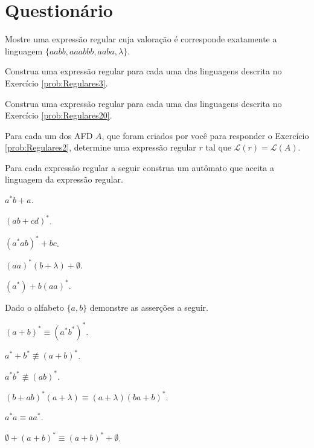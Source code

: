 \section{Questionário}

\begin{problem}\label{prob:Regulares28}
	Mostre uma expressão regular cuja valoração é corresponde exatamente a linguagem $\{aabb, aaabbb, aaba, \lambda\}$. 
\end{problem}

\begin{problem}\label{prob:Regulares29}
	Construa uma expressão regular para cada uma das linguagens descrita no Exercício \ref{prob:Regulares3}.
\end{problem}

\begin{problem}\label{prob:Regulares30}
	Construa uma expressão regular para cada uma das linguagens descrita no Exercício \ref{prob:Regulares20}.
\end{problem}

\begin{problem}\label{prob:Regulares31}
	Para cada um dos AFD $A$, que foram criados por você para responder o Exercício \ref{prob:Regulares2}, determine uma expressão regular $r$ tal que $\mathcal{L}(r) = \mathcal{L}(A)$.
\end{problem}

\begin{problem}\label{prob:Regulares32}
	Para cada expressão regular a seguir construa um autômato que aceita a linguagem da expressão regular.
\end{problem}

\begin{exerList}
	\item $a^*b + a$.
	\item $(ab + cd)^*$.
	\item $(a^*ab)^* + bc$.
	\item $(aa)^* (b + \lambda) + \emptyset$.
	\item $(a^*) + b(aa)^*$.
\end{exerList}

\begin{problem}\label{prob:Regulares33}
	Dado o alfabeto $\{a, b\}$ demonstre as asserções a seguir.
\end{problem}

\begin{exerList}
	\item $(a + b)^* \equiv (a^*b^*)^*$.
	\item $a^* + b^* \not\equiv (a + b)^*$.
	\item $a^*b^* \not\equiv (ab)^*$.
	\item $(b + ab)^* (a + \lambda) \equiv (a + \lambda)(ba + b)^*$.
	\item $a^*a \equiv aa^*$.
	\item $\emptyset + (a + b)^* \equiv (a + b)^* + \emptyset$.
\end{exerList}

